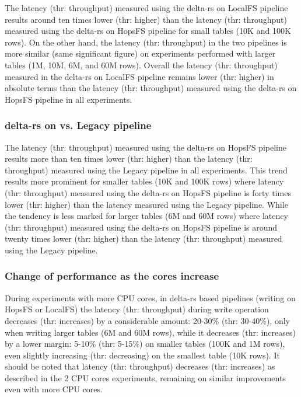 The latency (thr: throughput) measured using the delta-rs on \gls{LocalFS} pipeline results around ten times lower (thr: higher) than the latency (thr: throughput) measured using the delta-rs on \gls{HopsFS} pipeline for small tables (10K and 100K rows). On the other hand, the latency (thr: throughput) in the two pipelines is more similar (same significant figure) on experiments performed with larger tables (1M, 10M, 6M, and 60M rows). Overall the latency (thr: throughput) measured in the delta-rs on \gls{LocalFS} pipeline remains lower (thr: higher) in absolute terms than the latency (thr: throughput) measured using the delta-rs on \gls{HopsFS} pipeline in all experiments.

\subsubsection*{delta-rs on  vs. Legacy pipeline}

The latency (thr: throughput) measured using the delta-rs on \gls{HopsFS} pipeline results more than ten times lower (thr: higher) than the latency (thr: throughput) measured using the Legacy pipeline in all experiments. This trend results more prominent for smaller tables (10K and 100K rows) where latency (thr: throughput) measured using the delta-rs on \gls{HopsFS} pipeline is forty times lower (thr: higher) than the latency measured using the Legacy pipeline. While the tendency is less marked for larger tables (6M and 60M rows) where latency (thr: throughput) measured using the delta-rs on \gls{HopsFS} pipeline is around twenty times lower (thr: higher) than the latency (thr: throughput) measured using the Legacy pipeline.

\subsubsection*{Change of performance as the  cores increase}

During experiments with more \gls{CPU} cores, in delta-rs based pipelines (writing on \gls{HopsFS} or \gls{LocalFS}) the latency (thr: throughput) during write operation decreases (thr: increases) by a considerable amount: 20-30\% (thr: 30-40\%), only when writing larger tables (6M and 60M rows), while it decreases (thr: increases) by a lower margin: 5-10\% (thr: 5-15\%) on smaller tables (100K and 1M rows), even slightly increasing (thr: decreasing) on the smallest table (10K rows). It should be noted that latency (thr: throughput) decreases (thr: increases) as described in the 2 \gls{CPU} cores experiments, remaining on similar improvements even with more \gls{CPU} cores.

